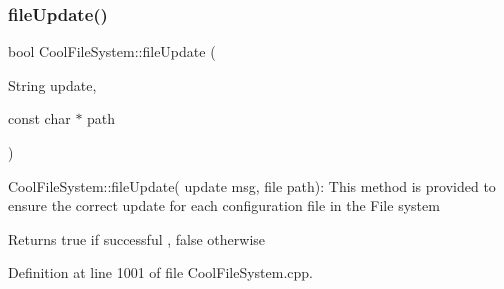 \subsubsection{\texorpdfstring{file\+Update()}{fileUpdate()}}
{\footnotesize\ttfamily bool Cool\+File\+System\+::file\+Update (\begin{DoxyParamCaption}\item[{String}]{update,  }\item[{const char $\ast$}]{path }\end{DoxyParamCaption})}

Cool\+File\+System\+::file\+Update( update msg, file path)\+: This method is provided to ensure the correct update for each configuration file in the File system

\begin{DoxyReturn}{Returns}
true if successful , false otherwise 
\end{DoxyReturn}


Definition at line 1001 of file Cool\+File\+System.\+cpp.


